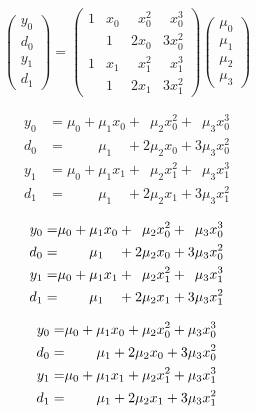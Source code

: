 \begin{equation}
\begin{pmatrix}
y_0 \\ d_0 \\ y_1 \\ d_1
\end{pmatrix}
=
\begin{pmatrix}
1 & x_0 & \phantom{2} x_0^2 & \phantom{3} x_0^3 \\
  & 1   & 2 x_0 & 3 x_0^2 \\
1 & x_1 & \phantom{2} x_1^2 & \phantom{3} x_1^3 \\
  & 1   & 2 x_1 & 3 x_1^2 
\end{pmatrix}
\begin{pmatrix}
\mu_0 \\ \mu_1 \\ \mu_2 \\ \mu_3
\end{pmatrix}
\end{equation}

\begin{align}
 y_0 & = \mu_0 + \mu_1 x_0 + \phantom{2} \mu_2 x_0^2 + \phantom{3} \mu_3 x_0^3 \\
 d_0 & = \phantom{\mu_0} \phantom{+} \mu_1 \phantom{x_0} + 2 \mu_2 x_0 + 3 \mu_3 x_0^2 \nonumber \\
 y_1 & = \mu_0 + \mu_1 x_1 + \phantom{2} \mu_2 x_1^2 + \phantom{3} \mu_3 x_1^3 \nonumber \\
 d_1 & = \phantom{\mu_0} \phantom{+} \mu_1 \phantom{x_0} + 2 \mu_2 x_1 + 3 \mu_3 x_1^2 \nonumber
\end{align}

\begin{align}
 y_0 = & {\mu_0 + \mu_1 x_0 + \phantom{2} \mu_2 x_0^2 + \phantom{3} \mu_3 x_0^3} \\
 d_0 = & \pushright{\mu_1 \phantom{x_0} + 2 \mu_2 x_0 + 3 \mu_3 x_0^2} \nonumber \\
 y_1 = & {\mu_0 + \mu_1 x_1 + \phantom{2} \mu_2 x_1^2 + \phantom{3} \mu_3 x_1^3 }\nonumber \\
 d_1 = & \pushright{\mu_1 \phantom{x_0} + 2 \mu_2 x_1 + 3 \mu_3 x_1^2} \nonumber
\end{align}

\begin{align}
 y_0 = & {\mu_0 + \mu_1 x_0 + \mu_2 x_0^2 + \mu_3 x_0^3} \\
 d_0 = & \pushright{\mu_1 + 2 \mu_2 x_0 + 3 \mu_3 x_0^2} \nonumber \\
 y_1 = & {\mu_0 + \mu_1 x_1 + \mu_2 x_1^2 + \mu_3 x_1^3 }\nonumber \\
 d_1 = & \pushright{\mu_1 + 2 \mu_2 x_1 + 3 \mu_3 x_1^2} \nonumber
\end{align}

